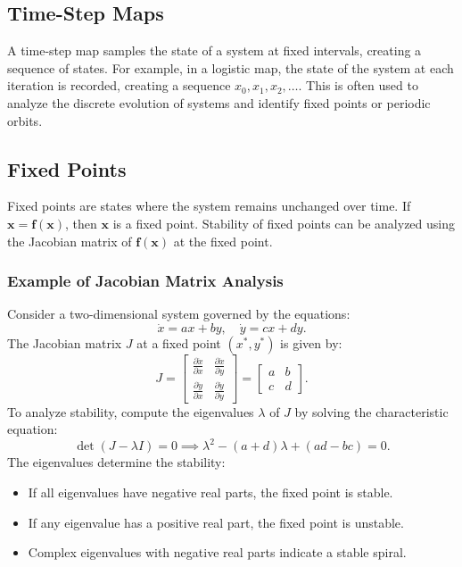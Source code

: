 \documentclass{article}
\begin{document}
\subsection{Time-Step Maps}
A time-step map samples the state of a system at fixed intervals, creating a sequence of states. For example, in a logistic map, the state of the system at each iteration is recorded, creating a sequence $x_0, x_1, x_2, \ldots$. This is often used to analyze the discrete evolution of systems and identify fixed points or periodic orbits.

\subsection{Fixed Points}
Fixed points are states where the system remains unchanged over time. If $\mathbf{x} = \mathbf{f}(\mathbf{x})$, then $\mathbf{x}$ is a fixed point. Stability of fixed points can be analyzed using the Jacobian matrix of $\mathbf{f}(\mathbf{x})$ at the fixed point.

\subsubsection{Example of Jacobian Matrix Analysis}
Consider a two-dimensional system governed by the equations:
\[
\dot{x} = ax + by, \quad \dot{y} = cx + dy.
\]
The Jacobian matrix $J$ at a fixed point $(x^*, y^*)$ is given by:
\[
J = \begin{bmatrix}
\frac{\partial \dot{x}}{\partial x} & \frac{\partial \dot{x}}{\partial y} \\
\frac{\partial \dot{y}}{\partial x} & \frac{\partial \dot{y}}{\partial y}
\end{bmatrix} = \begin{bmatrix}
a & b \\
c & d
\end{bmatrix}.
\]
To analyze stability, compute the eigenvalues $\lambda$ of $J$ by solving the characteristic equation:
\[
\det(J - \lambda I) = 0 \implies \lambda^2 - (a+d)\lambda + (ad - bc) = 0.
\]
The eigenvalues determine the stability:
\begin{itemize}
  \item If all eigenvalues have negative real parts, the fixed point is stable.
  \item If any eigenvalue has a positive real part, the fixed point is unstable.
  \item Complex eigenvalues with negative real parts indicate a stable spiral.
\end{itemize}
\end{document}
